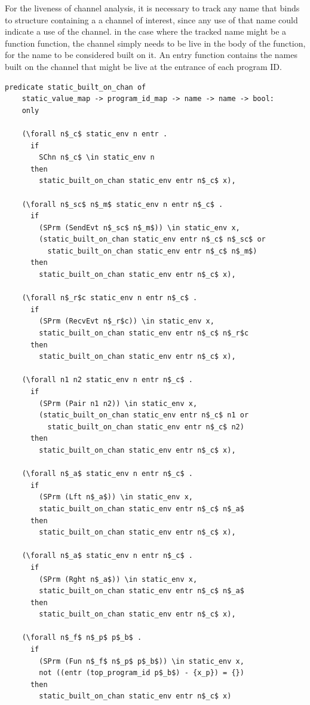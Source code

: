 \documentclass[10pt]{article}
\begin{document}
For the liveness of channel analysis, it is necessary to track any name that binds to structure
containing a a channel of interest, since any use of that name could indicate a use of the
channel. in the case where the tracked name might be a function function, the channel simply
needs to be live in the body of the function, for the name to be considered built on it.
An entry function contains the names built on the channel that might be live at the entrance
of each program ID.

\begin{lstlisting}[language=logic, mathescape]
  predicate static_built_on_chan of
    static_value_map -> program_id_map -> name -> name -> bool:
    only

    (\forall n$_c$ static_env n entr .
      if 
        SChn n$_c$ \in static_env n 
      then 
        static_built_on_chan static_env entr n$_c$ x),

    (\forall n$_sc$ n$_m$ static_env n entr n$_c$ . 
      if
        (SPrm (SendEvt n$_sc$ n$_m$)) \in static_env x,
        (static_built_on_chan static_env entr n$_c$ n$_sc$ or
          static_built_on_chan static_env entr n$_c$ n$_m$)
      then 
        static_built_on_chan static_env entr n$_c$ x),

    (\forall n$_r$c static_env n entr n$_c$ . 
      if  
        (SPrm (RecvEvt n$_r$c)) \in static_env x,
        static_built_on_chan static_env entr n$_c$ n$_r$c
      then 
        static_built_on_chan static_env entr n$_c$ x),

    (\forall n1 n2 static_env n entr n$_c$ . 
      if  
        (SPrm (Pair n1 n2)) \in static_env x,
        (static_built_on_chan static_env entr n$_c$ n1 or
          static_built_on_chan static_env entr n$_c$ n2)
      then 
        static_built_on_chan static_env entr n$_c$ x),

    (\forall n$_a$ static_env n entr n$_c$ .
      if
        (SPrm (Lft n$_a$)) \in static_env x,
        static_built_on_chan static_env entr n$_c$ n$_a$
      then 
        static_built_on_chan static_env entr n$_c$ x),

    (\forall n$_a$ static_env n entr n$_c$ .
      if
        (SPrm (Rght n$_a$)) \in static_env x,
        static_built_on_chan static_env entr n$_c$ n$_a$
      then 
        static_built_on_chan static_env entr n$_c$ x),

    (\forall n$_f$ n$_p$ p$_b$ .
      if
        (SPrm (Fun n$_f$ n$_p$ p$_b$)) \in static_env x,
        not ((entr (top_program_id p$_b$) - {x_p}) = {})
      then
        static_built_on_chan static_env entr n$_c$ x)
  \end{lstlisting}
\end{document}
